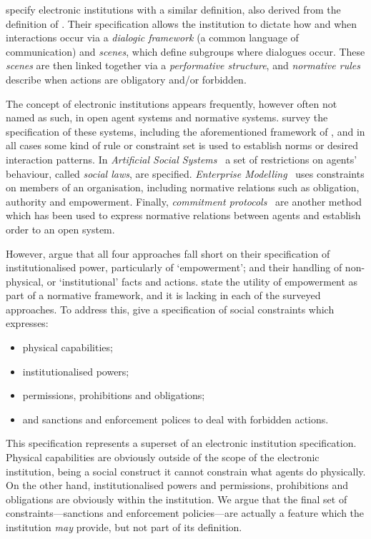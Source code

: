 \citet{Esteva2001} specify electronic institutions with a similar definition,
also derived from the definition of \citet{North1990}. Their specification allows
the institution to dictate how and when interactions occur via a
\emph{dialogic framework} (a common language of communication) and
\emph{scenes}, which define subgroups where dialogues occur. These
\emph{scenes} are then linked together via a \emph{performative structure},
and \emph{normative rules} describe when actions are obligatory and/or
forbidden.

The concept of electronic institutions appears frequently, however often not
named as such, in open agent systems and normative systems.
\citet{Artikis2009a} survey the specification of these systems, including the
aforementioned framework of \citet{Esteva2001}, and in all cases some kind of
rule or constraint set is used to establish norms or desired interaction
patterns. In \emph{Artificial Social Systems}~\citep{Moses1995} a set of
restrictions on agents' behaviour, called \emph{social laws}, are specified.
\emph{Enterprise Modelling}~\citep{Fox1995} uses constraints on members of an
organisation, including normative relations such as obligation, authority and
empowerment. Finally, \emph{commitment protocols}~\citep{Chopra2006} are another method which has
been used to express normative relations between agents and establish order to
an open system.

However, \citet{Artikis2009a} argue that all four approaches fall short on their
specification of institutionalised power, particularly of `empowerment'; and their
handling of non-physical, or `institutional' facts and actions. \citet{Jones1996}
state the utility of empowerment as part of a normative framework, and it is
lacking in each of the surveyed approaches. To address this, \citet{Artikis2009}
give a specification of social constraints which expresses: 
\begin{itemize}
\item physical capabilities;
\item institutionalised powers;
\item permissions, prohibitions and obligations; 
\item and sanctions and enforcement polices to deal with forbidden actions.
\end{itemize}

This specification represents a superset of an electronic institution
specification. Physical capabilities are obviously outside of the scope of the
electronic institution, being a social construct it cannot constrain what
agents do physically. On the other hand, institutionalised powers and
permissions, prohibitions and obligations are obviously within the
institution. We argue that the final set of constraints---sanctions and
enforcement policies---are actually a feature which the institution \emph{may}
provide, but not part of its definition.

